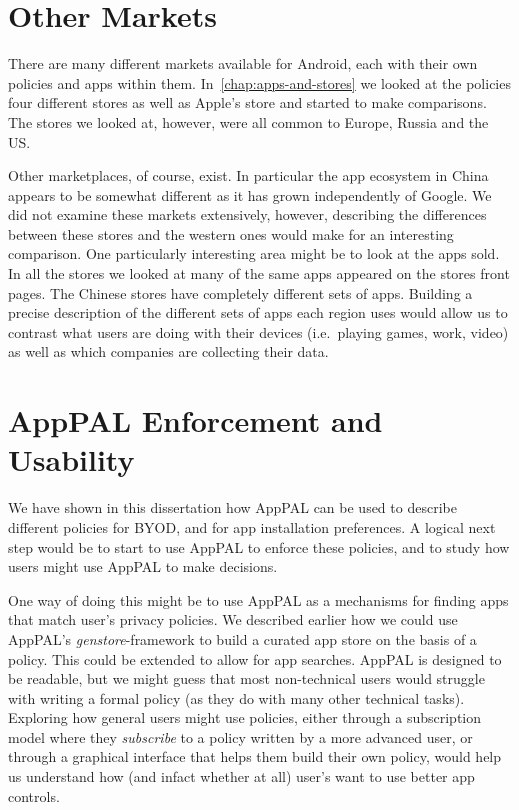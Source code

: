 \documentclass[thesis.tex]{subfiles}
\begin{document}
\section{Other Markets}

There are many different markets available for Android, each with their own
policies and apps within them. In~\autoref{chap:apps-and-stores} we looked at
the policies four different stores as well as Apple's store and started to make
comparisons. The stores we looked at, however, were all common to Europe, Russia
and the US.

Other marketplaces, of course, exist. In particular the app ecosystem in China
appears to be somewhat different as it has grown independently of Google. We did
not examine these markets extensively, however, describing the differences
between these stores and the western ones would make for an interesting
comparison. One particularly interesting area might be to look at the apps sold.
In all the stores we looked at many of the same apps appeared on the stores
front pages. The Chinese stores have completely different sets of apps. Building
a precise description of the different sets of apps each region uses would allow
us to contrast what users are doing with their devices (i.e.~playing games,
work, video) as well as which companies are collecting their data.

\section{AppPAL Enforcement and Usability}

We have shown in this dissertation how AppPAL can be used to describe different
policies for BYOD, and for app installation preferences. A logical next step
would be to start to use AppPAL to enforce these policies, and to study how
users might use AppPAL to make decisions.

One way of doing this might be to use AppPAL as a mechanisms for finding apps
that match user's privacy policies. We described earlier how we could use
AppPAL's \emph{genstore}-framework to build a curated app store on the basis of
a policy. This could be extended to allow for app searches. AppPAL is designed
to be readable, but we might guess that most non-technical users would struggle
with writing a formal policy (as they do with many other technical tasks).
Exploring how general users might use policies, either through a subscription
model where they \emph{subscribe} to a policy written by a more advanced user,
or through a graphical interface that helps them build their own policy, would
help us understand how (and infact whether at all) user's want to use better app
controls. 
\end{document}
